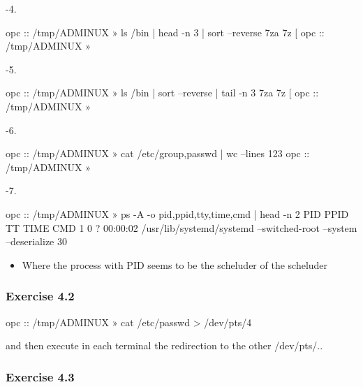 \documentclass[a4paper]{article}
\begin{document}
{-\allowbreak}4.

\begin{plain}
opc :: /tmp/ADMINUX » ls /bin | head -n 3 | sort --reverse 
7za
7z
[
opc :: /tmp/ADMINUX » 
\end{plain}

{-\allowbreak}5. 

\begin{plain}
opc :: /tmp/ADMINUX » ls /bin | sort --reverse | tail -n 3
7za
7z
[
opc :: /tmp/ADMINUX » 
\end{plain}

{-\allowbreak}6.

\begin{plain}
opc :: /tmp/ADMINUX » cat /etc/{group,passwd} | wc --lines
123
opc :: /tmp/ADMINUX » 
\end{plain}

{-\allowbreak}7.

\begin{plain}
opc :: /tmp/ADMINUX » ps -A -o pid,ppid,tty,time,cmd | head -n 2
    PID    PPID TT           TIME CMD
      1       0 ?        00:00:02 /usr/lib/systemd/systemd --switched-root --system --deserialize 30
\end{plain}

\begin{itemize}
\item 
Where the process with PID seems to be the scheluder of the scheluder 
\end{itemize}

\subsubsection{Exercise 4.2}

\begin{plain}
opc :: /tmp/ADMINUX » cat /etc/passwd > /dev/pts/4 
\end{plain}

and then execute in each terminal the redirection to the other {/\allowbreak}dev{/\allowbreak}pts{/\allowbreak}..

\subsubsection{Exercise 4.3}

\end{document}

